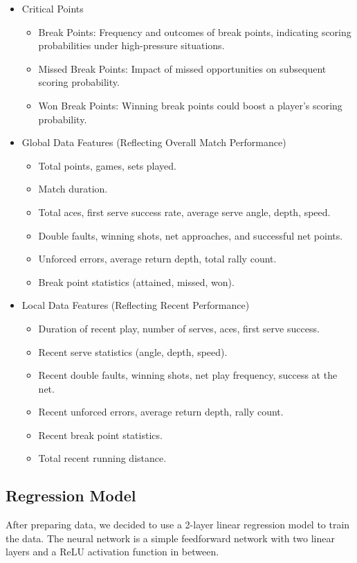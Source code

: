 \documentclass[11pt,a4paper]{article}
\begin{document}
\begin{itemize}
\begin{itemize}
		\end{itemize}
		\item Critical Points
		\begin{itemize}
			\item Break Points: Frequency and outcomes of break points, indicating scoring probabilities under high-pressure situations.
			\item Missed Break Points: Impact of missed opportunities on subsequent scoring probability.
			\item Won Break Points: Winning break points could boost a player's scoring probability.
		\end{itemize}
		\item Global Data Features (Reflecting Overall Match Performance)
		\begin{itemize}
			\item Total points, games, sets played.
			\item Match duration.
			\item Total aces, first serve success rate, average serve angle, depth, speed.
			\item Double faults, winning shots, net approaches, and successful net points.
			\item Unforced errors, average return depth, total rally count.
			\item Break point statistics (attained, missed, won).
		\end{itemize}
		\item Local Data Features (Reflecting Recent Performance)
		\begin{itemize}
			\item Duration of recent play, number of serves, aces, first serve success.
			\item Recent serve statistics (angle, depth, speed).
			\item Recent double faults, winning shots, net play frequency, success at the net.
			\item Recent unforced errors, average return depth, rally count.
			\item Recent break point statistics.
			\item Total recent running distance.
		\end{itemize}
	\end{itemize}
	
	\subsection{Regression Model}
	After preparing data, we decided to use a 2-layer linear regression model to train the data. The neural network is a simple feedforward network with two linear layers and a ReLU activation function in between.
	
\end{document}
